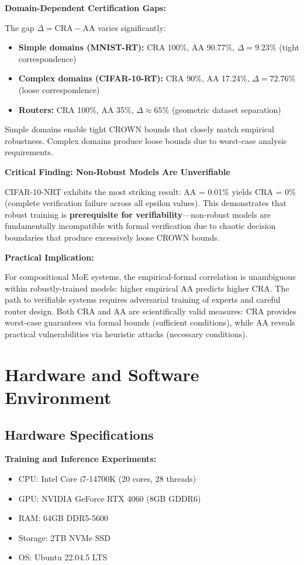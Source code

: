 \documentclass[11pt,a4paper]{article}
\begin{document}
\textbf{Domain-Dependent Certification Gaps:}

The gap $\Delta = \text{CRA} - \text{AA}$ varies significantly:

\begin{itemize}
    \item \textbf{Simple domains (MNIST-RT):} CRA 100\%, AA 90.77\%, $\Delta = 9.23\%$ (tight correspondence)
    \item \textbf{Complex domains (CIFAR-10-RT):} CRA 90\%, AA 17.24\%, $\Delta = 72.76\%$ (loose correspondence)
    \item \textbf{Routers:} CRA 100\%, AA 35\%, $\Delta \approx 65\%$ (geometric dataset separation)
\end{itemize}

Simple domains enable tight CROWN bounds that closely match empirical robustness. Complex domains produce loose bounds due to worst-case analysis requirements.

\textbf{Critical Finding: Non-Robust Models Are Unverifiable}

CIFAR-10-NRT exhibits the most striking result: AA = 0.01\% yields CRA = 0\% (complete verification failure across all epsilon values). This demonstrates that robust training is \textbf{prerequisite for verifiability}—non-robust models are fundamentally incompatible with formal verification due to chaotic decision boundaries that produce excessively loose CROWN bounds.

\textbf{Practical Implication:}

For compositional MoE systems, the empirical-formal correlation is unambiguous within robustly-trained models: higher empirical AA predicts higher CRA. The path to verifiable systems requires adversarial training of experts and careful router design. Both CRA and AA are scientifically valid measures: CRA provides worst-case guarantees via formal bounds (sufficient conditions), while AA reveals practical vulnerabilities via heuristic attacks (necessary conditions).

\section{Hardware and Software Environment}

\subsection{Hardware Specifications}

\textbf{Training and Inference Experiments:}
\begin{itemize}
    \item CPU: Intel Core i7-14700K (20 cores, 28 threads)
    \item GPU: NVIDIA GeForce RTX 4060 (8GB GDDR6)
    \item RAM: 64GB DDR5-5600
    \item Storage: 2TB NVMe SSD
    \item OS: Ubuntu 22.04.5 LTS
\end{itemize}
\end{document}
